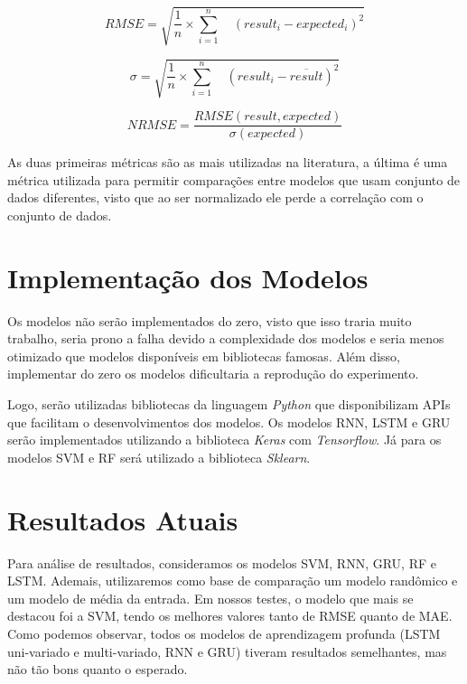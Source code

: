 \documentclass[conference]{IEEEtran}
\begin{document}
\begin{equation}
RMSE = \sqrt{ \frac{1}{n} \times \sum_{i=1}^{n} \quad (result_i - expected_i) ^ 2}
\end{equation}

\begin{equation}
\sigma = \sqrt{ \frac{1}{n} \times \sum_{i=1}^{n} \quad (result_i - \overline{result}) ^ 2}
\end{equation}

\begin{equation}
NRMSE = \frac{RMSE(result, expected)}{\sigma(expected)}
\end{equation}

As duas primeiras métricas são as mais utilizadas na literatura, a última é uma métrica utilizada para permitir comparações entre modelos que usam conjunto de dados diferentes, visto que ao ser normalizado ele perde a correlação com o conjunto de dados.

\section{Implementação dos Modelos}

Os modelos não serão implementados do zero, visto que isso traria muito trabalho, seria prono a falha devido a complexidade dos modelos e seria menos otimizado que modelos disponíveis em bibliotecas famosas. Além disso, implementar do zero os modelos dificultaria a reprodução do experimento. 

Logo, serão utilizadas bibliotecas da linguagem \textit{Python} que disponibilizam APIs que facilitam o desenvolvimentos dos modelos. Os modelos RNN, LSTM e GRU serão implementados utilizando a biblioteca \textit{Keras} com \textit{Tensorflow}. Já para os modelos SVM e RF será utilizado a biblioteca \textit{Sklearn}.

\section{Resultados Atuais}

Para análise de resultados, consideramos os modelos SVM, RNN, GRU, RF e LSTM. Ademais, utilizaremos como base de comparação um modelo randômico e um modelo de média da entrada. Em nossos testes, o modelo que mais se destacou foi a SVM, tendo os melhores valores tanto de RMSE quanto de MAE. Como podemos observar, todos os modelos de aprendizagem profunda (LSTM uni-variado e multi-variado, RNN e GRU) tiveram resultados semelhantes, mas não tão bons quanto o esperado. 
\end{document}
